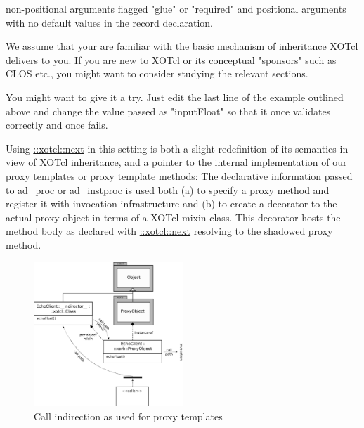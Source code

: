 non-positional arguments flagged "glue" or "required" and positional arguments with no default values in 
the record declaration.
%
\begin{hints}
\item We assume that your are familiar with the basic mechanism of inheritance XOTcl delivers to you. If 
you are new to XOTcl or its conceptual "sponsors" such as CLOS etc., you might want to consider 
studying the relevant sections.
\item You might want to give it a try. Just edit the last line of the example outlined above and change the 
value passed as "inputFloat" so that it once validates correctly and once fails.
\end{hints}
%
Using \href{http://media.wu-wien.ac.at/doc/tutorial.html#class_method_chaining}{::xotcl::next} in this setting is both a slight redefinition of its semantics in view of XOTcl inheritance, 
and a pointer to the internal implementation of our proxy templates or proxy template methods: The 
declarative information passed to ad\_proc or ad\_instproc is used both (a) to specify a proxy method 
and register it with invocation infrastructure and (b) to create a decorator to the actual proxy object in 
terms of a XOTcl mixin class. This decorator hosts the method body as declared with \href{http://media.wu-wien.ac.at/doc/tutorial.html#class_method_chaining}{::xotcl::next} 
resolving to the shadowed proxy method.

\begin{figure}[htbp]
\begin{center}
\includegraphics[width=0.5\textwidth]{img/proxy-template.png}
\caption{Call indirection as used for proxy templates}
\label{fig:advanced:templates:1}
\end{center}
\end{figure}


